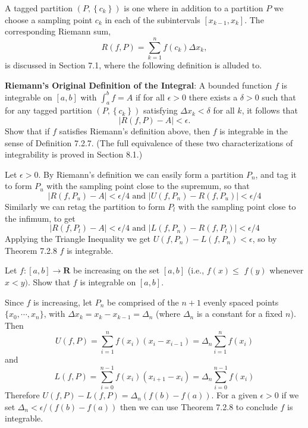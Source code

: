 \begin{exercise}
A tagged partition $\left(P,\left\{c_{k}\right\}\right)$ is one where in addition to a partition $P$ we choose a sampling point $c_{k}$ in each of the subintervals $\left[x_{k-1}, x_{k}\right]$. The corresponding Riemann sum,
$$
R(f, P)=\sum_{k=1}^{n} f\left(c_{k}\right) \Delta x_{k},
$$
is discussed in Section 7.1, where the following definition is alluded to.

{\bf Riemann's Original Definition of the Integral}: A bounded function $f$ is integrable on $[a, b]$ with $\int_{a}^{b} f=A$ if for all $\epsilon>0$ there exists a $\delta>0$ such that for any tagged partition $\left(P,\left\{c_{k}\right\}\right)$ satisfying $\Delta x_{k}<\delta$ for all $k$, it follows that
$$
|R(f, P)-A|<\epsilon .
$$
Show that if $f$ satisfies Riemann's definition above, then $f$ is integrable in the sense of Definition 7.2.7. (The full equivalence of these two characterizations of integrability is proved in Section 8.1.)
\end{exercise}
\begin{solution}
Let \(\epsilon > 0\). By Riemann's definition we can easily form a partition \(P_n\), and tag it to form \(P_u\) with the sampling point close to the supremum, so that
\[|R(f,P_u) - A| < \epsilon/4 \text{ and } |U(f,P_n) - R(f,P_u)| < \epsilon/4\]
 Similarly we can retag the partition to form \(P_l\) with the sampling point close to the infimum, to get
\[|R(f, P_l) - A| < \epsilon/4\text{ and }|L(f,P_n) - R(f, P_l)|<\epsilon/4\]
Applying the Triangle Inequality we get \(U(f,P_n) - L(f,P_n) < \epsilon\), so by Theorem 7.2.8 \(f\) is integrable.
\end{solution}

\begin{exercise}
Let $f:[a, b] \rightarrow \mathbf{R}$ be increasing on the set $[a, b]$ (i.e., $f(x) \leq$ $f(y)$ whenever $x<y)$. Show that $f$ is integrable on $[a, b]$.
\end{exercise}
\begin{solution}
Since \(f\) is increasing, let \(P_n\) be comprised of the \(n+1\) evenly spaced points \(\{x_0, \cdots, x_n\}\), with \(\Delta x_k = x_k - x_{k-1} = \Delta_n\) (where \(\Delta_n\) is a constant for a fixed \(n\)). Then
\[U(f,P) = \sum^n_{i=1} f(x_i) (x_i - x_{i-1}) = \Delta_n \sum^n_{i=1}f(x_i)\]
and
\[L(f,P) = \sum^{n-1}_{i=0} f(x_i) (x_{i+1} - x_i) = \Delta_n \sum^{n-1}_{i=0} f(x_i)\]
Therefore \(U(f,P) - L(f,P) = \Delta_n(f(b) - f(a))\). For a given \(\epsilon > 0\) if we set \(\Delta_n < \epsilon / (f(b) - f(a))\) then we can use Theorem 7.2.8 to conclude \(f\) is integrable.
\end{solution}
